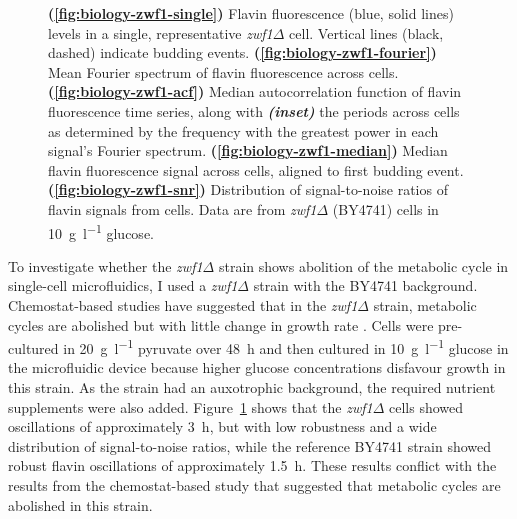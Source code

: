 \begin{figure}
  \caption[
    Flavin fluorescence levels in a single, representative \textit{zwf1$\Delta$} cell.
    Mean Fourier spectrum of flavin fluorescence across cells.
    Median autocorrelation function of flavin fluorescence time series, along with the periods across cells.
    Median flavin fluorescence signal across cells, aligned to first budding event.
    Distribution of signal-to-noise ratios of flavin signals from cells.
    Data are from \textit{zwf1$\Delta$} (BY4741) cells in \SI{10}{\gram~\litre^{-1}} glucose.
  ]{
    \textbf{(\ref{fig:biology-zwf1-single})}
    Flavin fluorescence (blue, solid lines) levels in a single, representative \textit{zwf1$\Delta$} cell.
    Vertical lines (black, dashed) indicate budding events.
    \textbf{(\ref{fig:biology-zwf1-fourier})}
    Mean Fourier spectrum of flavin fluorescence across cells.
    \textbf{(\ref{fig:biology-zwf1-acf})}
    Median autocorrelation function of flavin fluorescence time series, along with \textit{\textbf{(inset)}} the periods across cells as determined by the frequency with the greatest power in each signal's Fourier spectrum.
    \textbf{(\ref{fig:biology-zwf1-median})}
    Median flavin fluorescence signal across cells, aligned to first budding event.
    \textbf{(\ref{fig:biology-zwf1-snr})}
    Distribution of signal-to-noise ratios of flavin signals from cells.
    Data are from \textit{zwf1$\Delta$} (BY4741) cells in \SI{10}{\gram~\litre^{-1}} glucose.
  }
  \label{fig:biology-zwf1}
\end{figure}


To investigate whether the \textit{zwf1$\Delta$} strain shows abolition of the metabolic cycle in single-cell microfluidics, I used a \textit{zwf1$\Delta$} strain with the BY4741 background.
Chemostat-based studies have suggested that in the \textit{zwf1$\Delta$} strain, metabolic cycles are abolished but with little change in growth rate \parencite{tuCyclicChangesMetabolic2007}.
Cells were pre-cultured in \SI{20}{\gram~\litre^{-1}} pyruvate over \SI{48}{\hour} and then cultured in \SI{10}{\gram~\litre^{-1}} glucose in the microfluidic device because higher glucose concentrations disfavour growth in this strain.
As the strain had an auxotrophic background, the required nutrient supplements were also added.
%
Figure~\ref{fig:biology-zwf1} shows that the \textit{zwf1$\Delta$} cells showed oscillations of approximately \SI{3}{\hour}, but with low robustness and a wide distribution of signal-to-noise ratios, while the reference BY4741 strain showed robust flavin oscillations of approximately \SI{1.5}{\hour}.
These results conflict with the results from the chemostat-based study \parencite{tuCyclicChangesMetabolic2007} that suggested that metabolic cycles are abolished in this strain.


